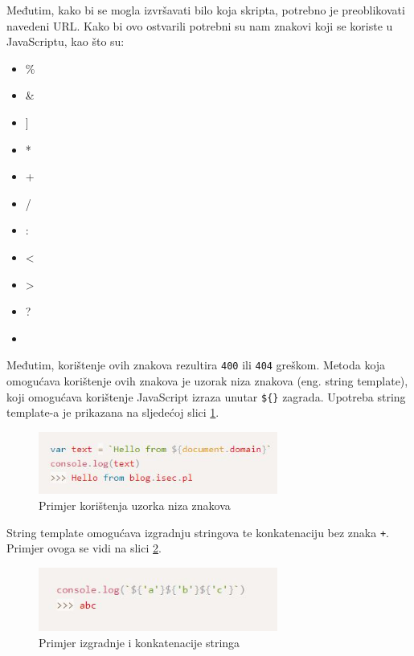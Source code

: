 \documentclass[12pt, oneside, onecolumn]{book}
\begin{document}
{Međutim, kako bi se mogla izvršavati bilo koja skripta, potrebno je preoblikovati navedeni URL. Kako bi ovo ostvarili potrebni su nam znakovi koji se koriste u JavaScriptu, kao što su:

\begin{itemize}
\item \%
\item \&
\item ]
\item *
\item +
\item /
\item :
\item <
\item >
\item ?
\item \
\end{itemize}

Međutim, korištenje ovih znakova rezultira \texttt{400} ili \texttt{404} greškom. Metoda koja omogućava korištenje ovih znakova je uzorak niza znakova (eng. string template), koji omogućava korištenje JavaScript izraza unutar \texttt{\$\{\}} zagrada. Upotreba string template-a je prikazana na sljedećoj slici \ref{fig:asp_ste}.

\begin{figure}[H]
	\begin{center}
		\includegraphics[width=0.7\textwidth]{asp_ste.jpg}
		\caption{Primjer korištenja uzorka niza znakova} \label{fig:asp_ste}
	\end{center}
\end{figure}

String template omogućava izgradnju stringova te konkatenaciju bez znaka \texttt{+}. Primjer ovoga se vidi na slici \ref{fig:asp_stc}.

\begin{figure}[H]
	\begin{center}
		\includegraphics[width=0.7\textwidth]{asp_stc.jpg}
		\caption{Primjer izgradnje i konkatenacije stringa} \label{fig:asp_stc}
	\end{center}
\end{figure}

}
\end{document}
